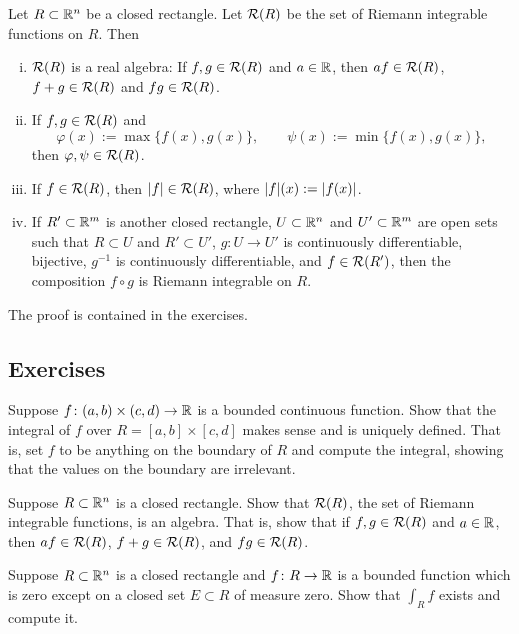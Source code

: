 \begin{cor} \label{cor:closednessofriemannintegrable}
Let $R \subset {\mathbb{R}}^n$ be a closed rectangle.  Let ${\mathcal{R}}(R)$ be the set
of Riemann integrable functions on $R$.  Then
\begin{enumerate}[(i)]
\item
${\mathcal{R}}(R)$ is a real algebra:
If $f,g \in {\mathcal{R}}(R)$ and $a \in {\mathbb{R}}$, then $af \in {\mathcal{R}}(R)$, $f+g \in {\mathcal{R}}(R)$
and $fg \in {\mathcal{R}}(R)$.
\item
If $f,g \in {\mathcal{R}}(R)$ and
\begin{equation*}
\varphi(x) := \max \{ f(x) , g(x) \} ,
\qquad
\psi(x) := \min \{ f(x) , g(x) \} ,
\end{equation*}
then $\varphi, \psi \in {\mathcal{R}}(R)$.
\item
If $f \in {\mathcal{R}}(R)$, then $\lvert {f} \rvert \in {\mathcal{R}}(R)$, where $\lvert {f} \rvert(x) :=
\lvert {f(x)} \rvert$.
\item
If $R' \subset {\mathbb{R}}^m$ is another closed rectangle,
$U \subset {\mathbb{R}}^n$ and $U' \subset {\mathbb{R}}^m$ are open sets such that
$R \subset U$ and $R' \subset U'$,
$g \colon U \to U'$ is continuously differentiable, bijective,
$g^{-1}$ is continuously differentiable,
and $f \in {\mathcal{R}}(R')$,
then the composition $f \circ g$ is Riemann integrable on $R$.
\end{enumerate}
\end{cor}

The proof is contained in the exercises.

\subsection{Exercises}

\begin{exercise}
Suppose $f \colon (a,b) \times (c,d) \to {\mathbb{R}}$ is a bounded continuous
function.  Show that the integral of $f$ over $R = [a,b] \times [c,d]$ makes sense
and is uniquely defined.  That is, set $f$ to be anything on the boundary of
$R$ and compute the integral, showing that the values on the boundary are
irrelevant.
\end{exercise}

\begin{exercise}
Suppose $R \subset {\mathbb{R}}^n$ is a closed rectangle.  Show that ${\mathcal{R}}(R)$, the set
of Riemann integrable functions, is an algebra.  That is, show that
if $f,g \in {\mathcal{R}}(R)$ and $a \in {\mathbb{R}}$, then $af \in {\mathcal{R}}(R)$, $f+g \in {\mathcal{R}}(R)$,
and $fg \in {\mathcal{R}}(R)$.
\end{exercise}

\begin{exercise}
Suppose $R \subset {\mathbb{R}}^n$ is a closed rectangle and
$f \colon R \to {\mathbb{R}}$ is a bounded function which is zero except on a closed set $E
\subset R$ of measure
zero.  Show that $\int_R f$ exists and compute it.
\end{exercise}

